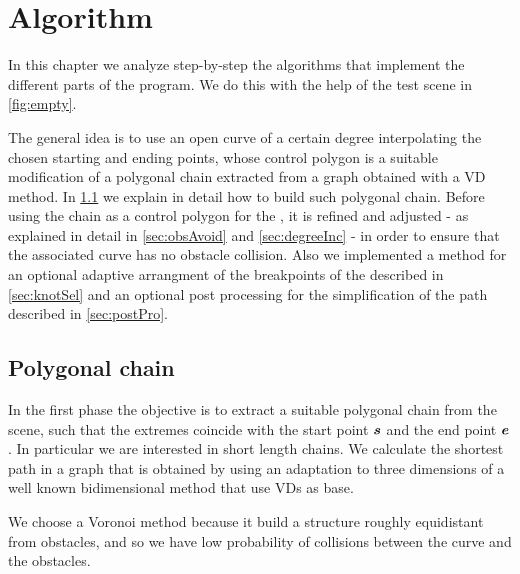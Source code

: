 \documentclass[dissertation.tex]{subfiles}
\begin{document}
\chapter{Algorithm}
In this chapter we analyze step-by-step the algorithms that implement
the different parts of the program. We do this with the help of the
test scene in \cref{fig:empty}.

The general idea is to use an open \bs curve of a certain degree
interpolating the chosen starting and ending points, whose
control polygon is a suitable modification of a polygonal chain
extracted from a graph
obtained with a \ac{VD} method. In \cref{sec:polChain} we
explain in detail how to
build such polygonal chain. Before using the chain as a control
polygon for the \bs, it is refined and adjusted - as explained in
detail in \cref{sec:obsAvoid} and \cref{sec:degreeInc} - in order to
ensure that the associated \bs curve has no obstacle
collision. Also we implemented a method for an optional adaptive
arrangment of the breakpoints of the \bs described in
\cref{sec:knotSel} and an optional post processing for the
simplification of the path described in \cref{sec:postPro}.
\section{Polygonal chain}\label{sec:polChain}
In the first phase the objective is to extract a suitable polygonal chain from
the scene, such that the extremes coincide with the start point $\boldsymbol{s}$
and the end point $\boldsymbol{e}$. In particular we are interested in short length
chains. We calculate the shortest path
in a graph that is obtained by using an adaptation to three
dimensions of a well known bidimensional method
\cite{bhattacharya}\cite{ho-liu}\cite{seda-pich} that use
\acp{VD} as base.

We choose a Voronoi method because it build a structure roughly
equidistant from obstacles, and so we have low probability of
collisions between the curve and the obstacles.
\end{document}
